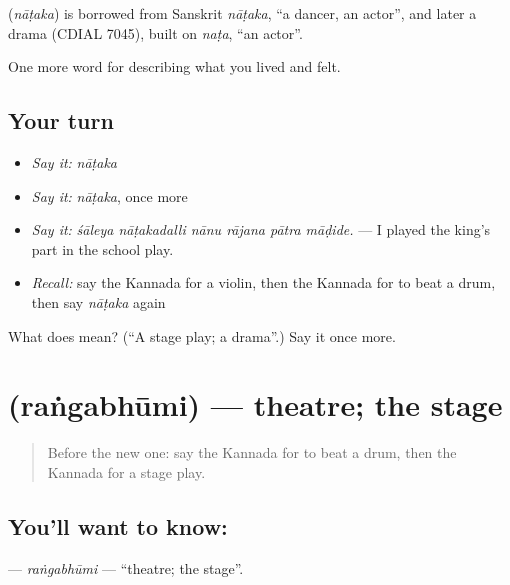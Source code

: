 \begin{cousinweb}
\textbf{} (\emph{nāṭaka}) is borrowed from Sanskrit \emph{nāṭaka}, \textquotedblleft{}a dancer, an actor\textquotedblright{}, and later a drama (CDIAL 7045), built on \emph{naṭa}, \textquotedblleft{}an actor\textquotedblright{}.
\end{cousinweb}

\begin{grammarlens}[title={What you've built}]
One more word for describing what you lived and felt.
\end{grammarlens}

\subsection*{Your turn}
\begin{itemize}
\raggedright
  \item \emph{Say it:} \emph{nāṭaka}
  \item \emph{Say it:} \emph{nāṭaka}, once more
  \item \emph{Say it:} \emph{śāleya nāṭakadalli nānu rājana pātra māḍide.} — I played the king's part in the school play.
  \item \emph{Recall:} say the Kannada for a violin, then the Kannada for to beat a drum, then say \emph{nāṭaka} again
\end{itemize}

\begin{tcolorbox}[breakable,colback=teal!4,colframe=teal!35!black,title={Before you move on}]
What does  mean? (\textquotedblleft{}A stage play; a drama\textquotedblright{}.) Say it once more.
\end{tcolorbox}
\section[\texorpdfstring{\kn{ರಂಗಭೂಮಿ} (raṅgabhūmi)}{ರಂಗಭೂಮಿ (raṅgabhūmi)}]{ (raṅgabhūmi) — theatre; the stage}

\label{lesson:KA-C536-rangabhumi}



\begin{quote}
Before the new one: say the Kannada for to beat a drum, then the Kannada for a stage play.
\end{quote}

\subsection*{You'll want to know: }
\textbf{} — \emph{raṅgabhūmi} — \textquotedblleft{}theatre; the stage\textquotedblright{}.

